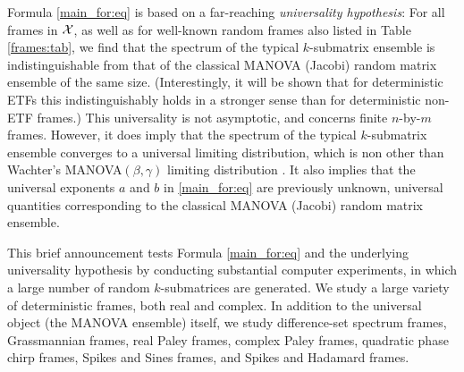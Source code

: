 \documentclass[a4paper,12pt]{article}
\newcommand{\E}{\ensuremath{\mathbb{E}}}
\newcommand{\m}{m}
\newcommand{\specstat}{\ensuremath{\Psi}}
\newcommand{\Gk}{\ensuremath{G_K}}
\begin{document}
Formula \ref{main_for:eq} is based on a far-reaching 
{\em universality hypothesis}: 
For all frames in $\cal X$, as well as for well-known random frames also listed in
Table \ref{frames:tab}, we find that
the spectrum of the typical $k$-submatrix ensemble is indistinguishable 
from that of the classical MANOVA (Jacobi) random matrix ensemble
\cite{forrester}
of the same
size. 
(Interestingly, it will be shown that for deterministic ETFs this
indistinguishably holds in a stronger sense than for deterministic non-ETF
frames.)
This universality is not asymptotic, and concerns 
finite $n$-by-$\m$ frames. However, it does imply that the spectrum of the
typical $k$-submatrix ensemble converges to 
a  universal limiting distribution, which is non other than 
Wachter's  
MANOVA$(\beta,\gamma)$ limiting distribution \cite{wachter}. 
It also implies that the universal exponents $a$ and $b$
in \eqref{main_for:eq}
are previously unknown, universal quantities corresponding to the 
classical MANOVA (Jacobi) random matrix ensemble.


This brief announcement tests Formula
\ref{main_for:eq} and the underlying universality hypothesis
by conducting substantial computer
experiments, in which a large number of random $k$-submatrices are generated. 
%
We  study a large variety of  deterministic frames, both
real and complex. In addition to the universal object (the MANOVA ensemble)
itself, 
we study difference-set spectrum frames,
Grassmannian frames, real Paley frames, complex Paley frames, quadratic phase
chirp frames, Spikes and Sines frames, and Spikes and Hadamard frames. 
\end{document}
